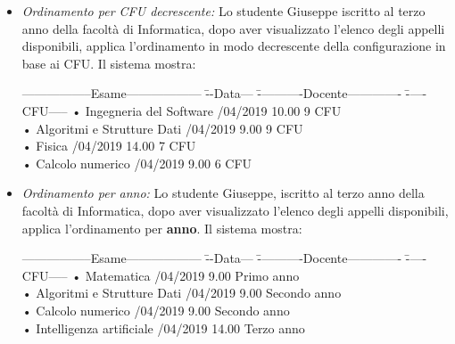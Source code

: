 \begin{itemize}
	\item \textit{Ordinamento per CFU decrescente:}
	Lo studente Giuseppe iscritto al terzo anno della facoltà di Informatica, dopo aver visualizzato l'elenco degli appelli disponibili, applica l'ordinamento in modo decrescente della configurazione in base ai CFU. Il sistema mostra:
	\begin{tabbing}
		\hspace{1cm}-----------------Esame------------------ \= --Data--- \= -----------Docente------------- \= -----CFU----- \kill
		\hspace{1cm} • Ingegneria del Software /04/2019 10.00 \> \hspace{2cm} 9 CFU \\
		\hspace{1cm} • Algoritmi e Strutture Dati /04/2019 9.00\> \hspace{2cm} 9 CFU \\
		\hspace{1cm} • Fisica /04/2019 14.00\> \hspace{2cm} 7 CFU  \\
		\hspace{1cm} • Calcolo numerico /04/2019 9.00 \> \hspace{2cm} 6 CFU \\
	\end{tabbing} 
	
	\item \textit{Ordinamento per anno:}
	Lo studente Giuseppe, iscritto al terzo anno della facoltà di Informatica, dopo aver visualizzato l’elenco degli appelli disponibili, applica l’ordinamento per \textbf{anno}. Il sistema mostra:
	\begin{tabbing}
		\hspace{1cm}-----------------Esame------------------ \= --Data--- \= -----------Docente------------- \= -----CFU----- \kill
		\hspace{1cm} • Matematica /04/2019 9.00 \> \hspace{2cm} Primo anno \\
		\hspace{1cm} • Algoritmi e Strutture Dati /04/2019 9.00\> \hspace{2cm} Secondo anno \\
		\hspace{1cm} • Calcolo numerico /04/2019 9.00 \> \hspace{2cm} Secondo anno \\
		\hspace{1cm} • Intelligenza artificiale /04/2019 14.00\> \hspace{2cm} Terzo anno  \\
	\end{tabbing} 


\end{itemize}
